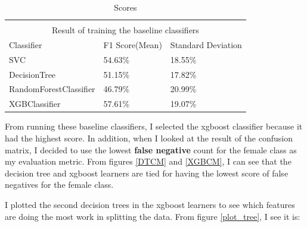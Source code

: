\setlength{\extrarowheight}{1.5pt}
\begin{table}[!htbp]
\caption{Scores} %
\centering %
\begin{tabular}{|l|l|l|} %
\hline %


\multicolumn{3}{|c|}{}\\
\multicolumn{3}{|c|}{Result of training the baseline classifiers}\\[5pt]
\hline
Classifier & F1 Score(Mean) & Standard Deviation\\[0.5ex]
\hline %

SVC     & 54.63\% & 18.55\% \\
DecisionTree       & 51.15\% & 17.82\%\\
RandomForestClassifier   & 46.79\% & 20.99\%\\
XGBClassifier            & 57.61\% & 19.07\%\\

\hline%
\end{tabular}
\label{tableBenchMarkScores}{}
\end{table}

From running these baseline classifiers, I selected the xgboost classifier because it had the highest score. In addition, when I looked at the result of the confusion matrix, I decided to use the lowest \textbf{false negative} count for the female class as my evaluation metric. From figures \ref{DTCM} and \ref{XGBCM}, I can see that the decision tree and xgboost learners are tied for having the lowest score of false negatives for the female class.

I plotted the second decision trees in the xgboost learners to see which features are doing the most work in splitting the data. From figure \ref{plot_tree}, I see it is: 

